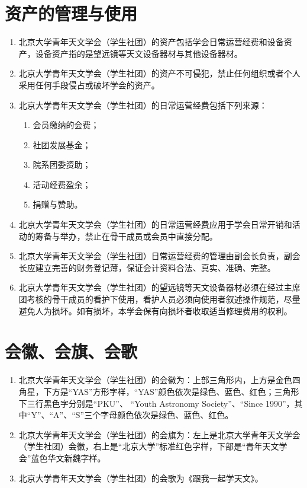 \begin{enumerate}[resume]
\end{enumerate}

\section{资产的管理与使用}

\begin{enumerate}[resume]
    \item 北京大学青年天文学会（学生社团）的资产包括学会日常运营经费和设备资产，设备资产指的是望远镜等天文设备器材与其他设备器材。
    
    \item 北京大学青年天文学会（学生社团）的资产不可侵犯，禁止任何组织或者个人采用任何手段侵占或破坏学会的资产。
    
    \item 北京大学青年天文学会（学生社团）的日常运营经费包括下列来源：
    
    \begin{enumerate}
        \item 会员缴纳的会费；
        \item 社团发展基金；
        \item 院系团委资助；
        \item 活动经费盈余；
        \item 捐赠与赞助。
    \end{enumerate}
    
    \item 北京大学青年天文学会（学生社团）的日常运营经费应用于学会日常开销和活动的筹备与举办，禁止在骨干成员或会员中直接分配。
    
    \item 北京大学青年天文学会（学生社团）日常运营经费的管理由副会长负责，副会长应建立完善的财务登记薄，保证会计资料合法、真实、准确、完整。
    
    \item 北京大学青年天文学会（学生社团）的望远镜等天文设备器材必须在经过主席团考核的骨干成员的看护下使用，看护人员必须向使用者叙述操作规范，尽量避免人为损坏。如有损坏，本学会保有向损坏者收取适当修理费用的权利。
\end{enumerate}

\section{会徽、会旗、会歌}

\begin{enumerate}[resume]
    \item 北京大学青年天文学会（学生社团）的会徽为：上部三角形内，上方是金色四角星，下方是“YAS”方形字样，“YAS”颜色依次是绿色、蓝色、红色；三角形下三行黑色字分别是“PKU”、 “Youth Astronomy Society”、“Since 1990”，其中“Y”、“A”、“S”三个字母颜色依次是绿色、蓝色、红色。
    
    \item 北京大学青年天文学会（学生社团）的会旗为：左上是北京大学青年天文学会（学生社团）会徽，右上是“北京大学”标准红色字样，下部是“青年天文学会”蓝色华文新魏字样。
    
    \item 北京大学青年天文学会（学生社团）的会歌为《跟我一起学天文》。
\end{enumerate}

